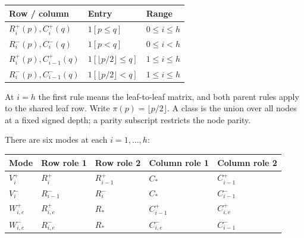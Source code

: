 \documentclass[11pt,letterpaper]{article}
\begin{document}
\begin{longtable}[]{@{}lll@{}}
\toprule\noalign{}
Row / column & Entry & Range \\
\midrule\noalign{}
\endhead
\bottomrule\noalign{}
\endlastfoot
\(R_i^+(p), C_i^+(q)\) & \(1[p\le q]\) & \(0\le i\le h\) \\
\(R_i^-(p), C_i^-(q)\) & \(1[p<q]\) & \(0\le i<h\) \\
\(R_i^+(p), C_{i-1}^+(q)\) & \(1[\lfloor p/2\rfloor \le q]\) &
\(1\le i\le h\) \\
\(R_i^-(p), C_{i-1}^-(q)\) & \(1[\lfloor p/2\rfloor <q]\) &
\(1\le i\le h\) \\
\end{longtable}

At \(i=h\) the first rule means the leaf-to-leaf matrix, and both parent
rules apply to the shared leaf row. Write
\(\pi (p)=\lfloor p/2\rfloor \). A class is the union over all nodes at
a fixed signed depth; a parity subscript restricts the node parity.


There are six modes at each \(i=1,\ldots ,h\):

\begin{longtable}[]{@{}
  >{\raggedright\arraybackslash}p{}
  >{\raggedright\arraybackslash}p{}
  >{\raggedright\arraybackslash}p{}
  >{\raggedright\arraybackslash}p{}
  >{\raggedright\arraybackslash}p{}@{}}
\toprule\noalign{}
\begin{minipage}[b]{\linewidth}\raggedright
Mode
\end{minipage} & \begin{minipage}[b]{\linewidth}\raggedright
Row role 1
\end{minipage} & \begin{minipage}[b]{\linewidth}\raggedright
Row role 2
\end{minipage} & \begin{minipage}[b]{\linewidth}\raggedright
Column role 1
\end{minipage} & \begin{minipage}[b]{\linewidth}\raggedright
Column role 2
\end{minipage} \\
\midrule\noalign{}
\endhead
\bottomrule\noalign{}
\endlastfoot
\(V_i^+\) & \(R_i^+\) & \(R_{i-1}^+\) & \(C_*\) & \(C_{i-1}^+\) \\
\(V_i^-\) & \(R_{i-1}^-\) & \(R_i^-\) & \(C_*\) & \(C_{i-1}^-\) \\
\(W_{i,e}^+\) & \(R_{i,e}^+\) & \(R_*\) & \(C_{i-1}^+\) &
\(C_{i,e}^+\) \\
\(W_{i,e}^-\) & \(R_{i,e}^-\) & \(R_*\) & \(C_{i,e}^-\) &
\(C_{i-1}^-\) \\
\end{longtable}
\end{document}

